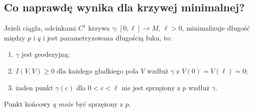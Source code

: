 \subsection*{Co naprawdę wynika dla krzywej minimalnej?}

\begin{twierdzenie}
\label{thm:minimalna-bez-sprzezonego-wewnatrz}
Jeżeli ciągła, odcinkami $C^1$ krzywa
$\gamma:[0,\ell]\to M$, $\ell>0$, minimalizuje
długość między $p$ i $q$ i jest parametryzowana
długością łuku, to:
\begin{enumerate}[label=\textup{(\roman*)}]
 \item $\gamma$ jest geodezyjną;
 \item $I(V,V)\geq0$ dla każdego gładkiego pola
       $V$ wzdłuż $\gamma$ z $V(0)=V(\ell)=0$;
 \item żaden punkt $\gamma(c)$ dla
       $0<c<\ell$ nie jest sprzężony z $p$
       wzdłuż $\gamma$.
\end{enumerate}
Punkt końcowy $q$ \emph{może} być sprzężony z $p$.
\end{twierdzenie}
